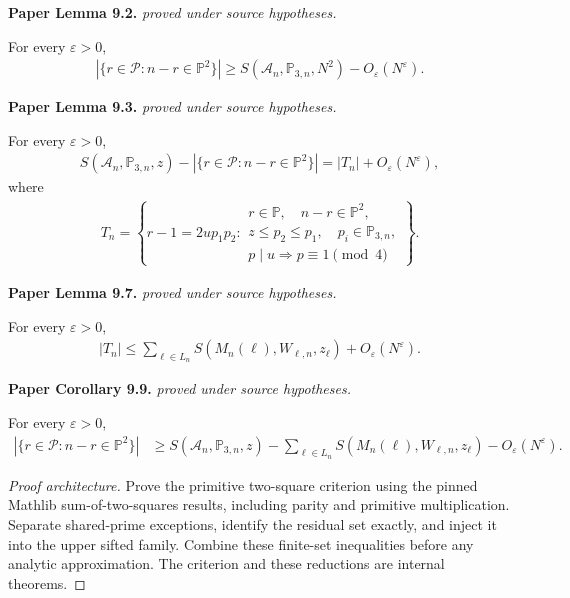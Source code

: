 \begin{lemma}
\label{goldbach_reductions}
\leanok
\par\medskip\noindent\textbf{Paper Lemma 9.2.} \textit{proved under source hypotheses.}\par
For every $\varepsilon>0$,
\begin{align}
 |\{r\in\mathcal P:n-r\in\mathbb P^2\}|
 \geq S(\mathcal A_n,\mathbb P_{3,n},N^2)-O_\varepsilon(N^\varepsilon).
\end{align}
\par\medskip\noindent\textbf{Paper Lemma 9.3.} \textit{proved under source hypotheses.}\par
For every \(\varepsilon>0\),
\begin{align}
 S(\mathcal A_n,\mathbb P_{3,n},z)
 -
 |\{r\in\mathcal P:n-r\in\mathbb P^2\}|
 =
 |T_n|+O_\varepsilon(N^\varepsilon),
\end{align}
where
\begin{align}
    T_n=
 \left\{
 r-1=2up_1p_2:
 \begin{array}{l}
 r\in\mathbb P,\quad n-r\in\mathbb P^2,\\
 z\leq p_2\leq p_1,\quad p_i\in\mathbb P_{3,n},\\
 p\mid u\Longrightarrow p\equiv1\pmod4
 \end{array}
 \right\}.
\end{align}
\par\medskip\noindent\textbf{Paper Lemma 9.7.} \textit{proved under source hypotheses.}\par
For every $\varepsilon>0$,
\begin{align}
 |T_n|
 \leq\sum_{\ell\in L_n}
 S(M_n(\ell),W_{\ell,n},z_\ell)+O_\varepsilon(N^\varepsilon).
\end{align}
\par\medskip\noindent\textbf{Paper Corollary 9.9.} \textit{proved under source hypotheses.}\par
For every $\varepsilon>0$,
\begin{align}
 |\{r\in\mathcal P:n-r\in\mathbb P^2\}|
 &\geq S(\mathcal A_n,\mathbb P_{3,n},z)-\sum_{\ell\in L_n}
 S(M_n(\ell),W_{\ell,n},z_\ell)
 -O_\varepsilon(N^\varepsilon).
\end{align}
\end{lemma}
\begin{proof}[Proof architecture]
\leanok
Prove the primitive two-square criterion using the pinned Mathlib sum-of-two-squares results, including parity and primitive multiplication. Separate shared-prime exceptions, identify the residual set exactly, and inject it into the upper sifted family. Combine these finite-set inequalities before any analytic approximation. The criterion and these reductions are internal theorems.
\end{proof}

